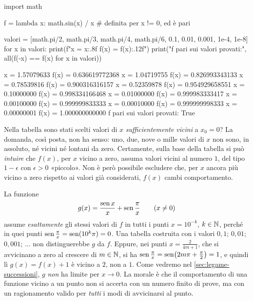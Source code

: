 \begin{python}
import math

f = lambda x: math.sin(x) / x    # definita per x != 0, ed è pari

valori = [math.pi/2, math.pi/3, math.pi/4, math.pi/6,
          0.1, 0.01, 0.001, 1e-4, 1e-8]
for x in valori:
    print(f"x = {x:.8f}    f(x) = {f(x):.12f}")
print("f pari sui valori provati:",
      all(f(-x) == f(x) for x in valori))
\end{python}
\begin{risultato}
x = 1.57079633    f(x) = 0.636619772368
x = 1.04719755    f(x) = 0.826993343133
x = 0.78539816    f(x) = 0.900316316157
x = 0.52359878    f(x) = 0.954929658551
x = 0.10000000    f(x) = 0.998334166468
x = 0.01000000    f(x) = 0.999983333417
x = 0.00100000    f(x) = 0.999999833333
x = 0.00010000    f(x) = 0.999999998333
x = 0.00000001    f(x) = 1.000000000000
f pari sui valori provati: True
\end{risultato}

Nella tabella sono stati scelti valori di $x$ \emph{sufficientemente vicini} a $x_{0}=0$?
La domanda, così posta, non ha senso: uno, due, nove o mille valori di $x$ non sono, in
assoluto, né vicini né lontani da zero. Certamente, sulla base della tabella si può
\emph{intuire} che $f(x)$, per $x$ vicino a zero, assuma valori vicini al numero $1$, del
tipo $1-\epsilon$ con $\epsilon>0$ «piccolo». Non è però possibile escludere che, per
$x$ ancora più vicino a zero rispetto ai valori già considerati, $f(x)$ cambi
comportamento.

\begin{attenzione}
La funzione
\[
  g(x)=\frac{\operatorname{sen} x}{x}+\operatorname{sen}\frac\pi x \qquad(x\neq0)
\]
assume \emph{esattamente} gli stessi valori di $f$ in tutti i punti $x=10^{-k}$,
$k\in\mathbb{N}$, perché in quei punti $\operatorname{sen}\frac\pi x=\operatorname{sen}(10^{k}\pi)=0$. Una tabella costruita
con i valori $0{,}1$; $0{,}01$; $0{,}001$; $\dots$ non distinguerebbe $g$ da $f$. Eppure,
nei punti $x=\frac2{4m+1}$, che si avvicinano a zero al crescere di $m\in\mathbb{N}$, si ha
$\operatorname{sen}\frac\pi x=\operatorname{sen}\bigl(2m\pi+\frac\pi2\bigr)=1$, e quindi lì $g(x)=f(x)+1$ è vicino
a $2$, non a $1$. Come vedremo nel \cref{sec:legame-successioni}, $g$ \emph{non} ha
limite per $x\to0$. La morale è che il comportamento di una funzione vicino a un punto
non si accerta con un numero finito di prove, ma con un ragionamento valido per
\emph{tutti} i modi di avvicinarsi al punto.
\end{attenzione}

